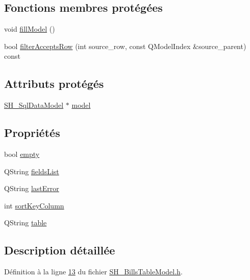 \subsection*{Fonctions membres protégées}
\begin{DoxyCompactItemize}
\item 
void \hyperlink{classSH__BillsTableModel_a0d9ba594d2be8b7af5856d2c4debad1a}{fill\-Model} ()
\item 
bool \hyperlink{classSH__ExtendedProxyModel_a1eda169699702a7bfed4dfa8718c0b86}{filter\-Accepts\-Row} (int source\-\_\-row, const Q\-Model\-Index \&source\-\_\-parent) const 
\end{DoxyCompactItemize}
\subsection*{Attributs protégés}
\begin{DoxyCompactItemize}
\item 
\hyperlink{classSH__SqlDataModel}{S\-H\-\_\-\-Sql\-Data\-Model} $\ast$ \hyperlink{classSH__ExtendedProxyModel_a8c8b8930c6b1abd9bbb1dce1fdc9690b}{model}
\end{DoxyCompactItemize}
\subsection*{Propriétés}
\begin{DoxyCompactItemize}
\item 
bool \hyperlink{classSH__ExtendedProxyModel_a9e22d17af7776aca8052084cc33c3442}{empty}
\item 
Q\-String \hyperlink{classSH__ExtendedProxyModel_a15e779ba92384a57442d6bd79ef3d1d1}{fields\-List}
\item 
Q\-String \hyperlink{classSH__ExtendedProxyModel_a287d34971582bbe68a7f1f0826165de5}{last\-Error}
\item 
int \hyperlink{classSH__ExtendedProxyModel_a47e2d0b99b84fb066438db667dd1ad26}{sort\-Key\-Column}
\item 
Q\-String \hyperlink{classSH__ExtendedProxyModel_a7eef4557a77444e9ce5c24c180392bfa}{table}
\end{DoxyCompactItemize}


\subsection{Description détaillée}


Définition à la ligne \hyperlink{SH__BillsTableModel_8h_source_l00013}{13} du fichier \hyperlink{SH__BillsTableModel_8h_source}{S\-H\-\_\-\-Bills\-Table\-Model.\-h}.



